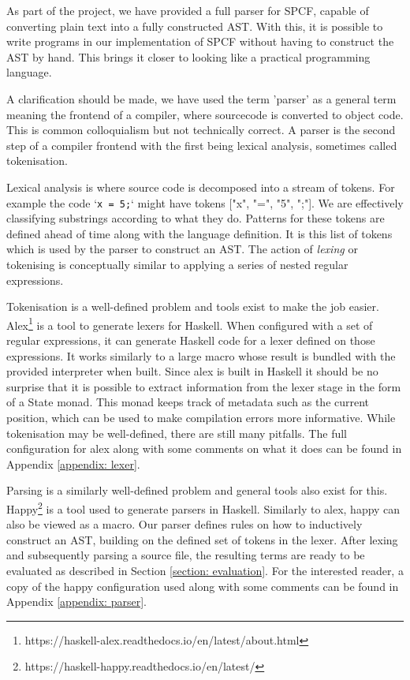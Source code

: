 \documentclass[12pt,a4paper]{report}
\theoremstyle{definition}
\theoremstyle{remark}
\begin{document}
As part of the project, we have provided a full parser for SPCF, capable of converting plain text into a fully constructed AST. With this, it is possible to write programs in our implementation of SPCF without having to construct the AST by hand. This brings it closer to looking like a practical programming language. 

A clarification should be made, we have used the term 'parser' as a general term meaning the frontend of a compiler, where sourcecode is converted to object code. This is common colloquialism but not technically correct. A parser is the second step of a compiler frontend with the first being lexical analysis, sometimes called tokenisation.

Lexical analysis is where source code is decomposed into a stream of tokens. For example the code `\lstinline{x = 5;}` might have tokens ["x", "=", "5", ";"]. We are effectively classifying substrings according to what they do. Patterns for these tokens are defined ahead of time along with the language definition. It is this list of tokens which is used by the parser to construct an AST. The action of \emph{lexing} or tokenising is conceptually similar to applying a series of nested regular expressions.

Tokenisation is a well-defined problem and tools exist to make the job easier. Alex\footnote{https://haskell-alex.readthedocs.io/en/latest/about.html} is a tool to generate lexers for Haskell. When configured with a set of regular expressions, it can generate Haskell code for a lexer defined on those expressions. It works similarly to a large macro whose result is bundled with the provided interpreter when built. Since alex is built in Haskell it should be no surprise that it is possible to extract information from the lexer stage in the form of a State monad. This monad keeps track of metadata such as the current position, which can be used to make compilation errors more informative. While tokenisation may be well-defined, there are still many pitfalls. The full configuration for alex along with some comments on what it does can be found in Appendix \ref{appendix: lexer}.

Parsing is a similarly well-defined problem and general tools also exist for this. Happy\footnote{https://haskell-happy.readthedocs.io/en/latest/} is a tool used to generate parsers in Haskell. Similarly to alex, happy can also be viewed as a macro. Our parser defines rules on how to inductively construct an AST, building on the defined set of tokens in the lexer. After lexing and subsequently parsing a source file, the resulting terms are ready to be evaluated as described in Section \ref{section: evaluation}. For the interested reader, a copy of the happy configuration used along with some comments can be found in Appendix \ref{appendix: parser}.
\end{document}
